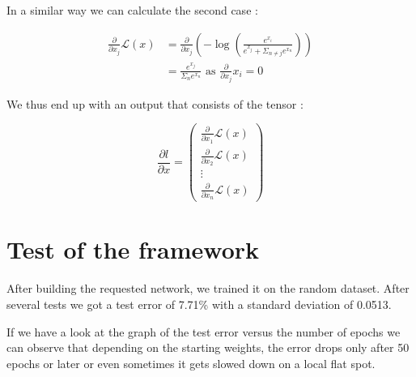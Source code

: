 \documentclass{article}
\begin{document}
In a similar way we can calculate the second case : 

\begin{equation}
\begin{split}
\frac{\partial}{\partial x_j} \mathcal{L}(x) & = \frac{\partial}{\partial x_j} \left( - \log \left( \frac{e^{x_i}}{e^{x_j} + \Sigma_{n \ne j} e^{x_n}} \right)\right) \\
 & = \frac{e^{x_j}}{\Sigma_{n} e^{x_n}} \text{ as } \frac{\partial}{\partial x_j} x_i = 0
\end{split}
\end{equation}


We thus end up with an output that consists of the tensor :


\[\frac{\partial l}{\partial x} = \begin{pmatrix}
									\frac{\partial}{\partial x_1}\mathcal{L}(x) \\
									\frac{\partial}{\partial x_2}\mathcal{L}(x) \\
									\vdots \\
									\frac{\partial}{\partial x_n}\mathcal{L}(x) 
								  \end{pmatrix} \]
								  

\section{Test of the framework}

After building the requested network, we trained it on the random dataset. After several tests we got a test error of 7.71\% with a standard deviation of 0.0513.

If we have a look at the graph of the test error versus the number of epochs we can observe that depending on the starting weights, the error drops only after 50 epochs or later or even sometimes it gets slowed down on a local flat spot.   
\end{document}
